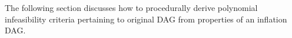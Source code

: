 The following section discusses how to procedurally derive polynomial infeasibility criteria pertaining to original DAG from properties of an inflation DAG. 

